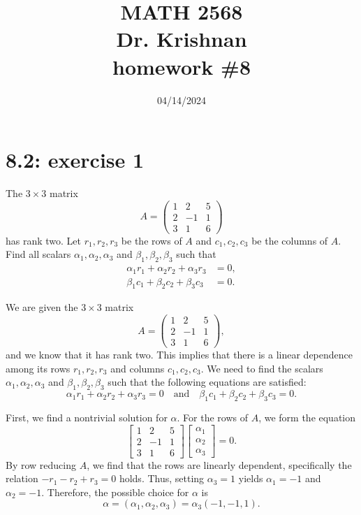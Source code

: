 \documentclass{report}
\title{\Huge{MATH 2568}\\\huge{Dr. Krishnan}\\homework \#8}
\author{\Huge{\mylink{https://www.sohumsuthar.com}{Sohum Suthar}}}
\date{\huge {04/14/2024}}
\begin{document}
\maketitle
\newpage
{}	
\tableofcontents
\pagebreak





\section*{8.2: exercise 1} 

The $3\times 3$ matrix
\[
A = \left(\begin{array}{ccc}
1 & 2 & 5 \\
2 & -1 & 1 \\
3 & 1 & 6
\end{array}\right)
\]
has rank two. Let $r_1, r_2, r_3$ be the rows of $A$ and
$c_1, c_2, c_3$ be the columns of $A$. Find all scalars $\alpha_1, \alpha_2, \alpha_3$ and
$\beta_1, \beta_2, \beta_3$ such that
\[
\begin{aligned}
\alpha_1 r_1 + \alpha_2 r_2 + \alpha_3 r_3 & = 0, \\
\beta_1 c_1 + \beta_2 c_2 + \beta_3 c_3 & = 0.
\end{aligned}
\]

\sol
We are given the $3 \times 3$ matrix
\[
A = \left(\begin{array}{ccc}
1 & 2 & 5 \\
2 & -1 & 1 \\
3 & 1 & 6
\end{array}\right),
\]
and we know that it has rank two. This implies that there is a linear dependence among its rows $r_1, r_2, r_3$ and columns $c_1, c_2, c_3$. We need to find the scalars $\alpha_1, \alpha_2, \alpha_3$ and $\beta_1, \beta_2, \beta_3$ such that the following equations are satisfied:
\[
\alpha_1 r_1 + \alpha_2 r_2 + \alpha_3 r_3 = 0 \quad \text{and} \quad \beta_1 c_1 + \beta_2 c_2 + \beta_3 c_3 = 0.
\]


First, we find a nontrivial solution for $\alpha$. For the rows of $A$, we form the equation
\[
\begin{bmatrix}
1 & 2 & 5 \\
2 & -1 & 1 \\
3 & 1 & 6
\end{bmatrix}
\begin{bmatrix}
\alpha_1 \\
\alpha_2 \\
\alpha_3
\end{bmatrix} = 0.
\]
By row reducing $A$, we find that the rows are linearly dependent, specifically the relation $-r_1 - r_2 + r_3 = 0$ holds. Thus, setting $\alpha_3 = 1$ yields $\alpha_1 = -1$ and $\alpha_2 = -1$. Therefore, the possible choice for $\alpha$ is 
\[
\alpha = (\alpha_1, \alpha_2, \alpha_3) = \alpha_3(-1, -1, 1).
\]
\end{document}
